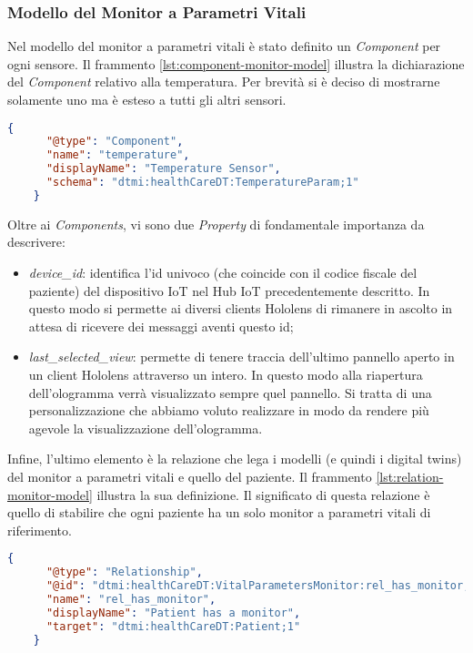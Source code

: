 \subsubsection{Modello del Monitor a Parametri Vitali}

Nel modello del monitor a parametri vitali è stato definito un \textit{Component} per ogni sensore. Il frammento \ref{lst:component-monitor-model} illustra la dichiarazione del \textit{Component} relativo alla temperatura. Per brevità si è deciso di mostrarne solamente uno ma è esteso a tutti gli altri sensori.
\begin{lstlisting}[label={lst:component-monitor-model}, caption={Componente temperature del modello del monitor.}, language=json, firstnumber=1]
    {
      "@type": "Component",
      "name": "temperature",
      "displayName": "Temperature Sensor",
      "schema": "dtmi:healthCareDT:TemperatureParam;1"
    }
\end{lstlisting}

Oltre ai \textit{Components}, vi sono due \textit{Property} di fondamentale importanza da descrivere:

\begin{itemize}
    \item \textit{device\_id}: identifica l'id univoco (che coincide con il codice fiscale del paziente) del dispositivo IoT nel Hub IoT precedentemente descritto. In questo modo si permette ai diversi clients Hololens di rimanere in ascolto in attesa di ricevere dei messaggi aventi questo id;
    
    \item \textit{last\_selected\_view}: permette di tenere traccia dell'ultimo pannello aperto in un client Hololens attraverso un intero. In questo modo alla riapertura dell'ologramma verrà visualizzato sempre quel pannello. Si tratta di una personalizzazione che abbiamo voluto realizzare in modo da rendere più agevole la visualizzazione dell'ologramma.
\end{itemize}

Infine, l'ultimo elemento è la relazione che lega i modelli (e quindi i digital twins) del monitor a parametri vitali e quello del paziente.
Il frammento \ref{lst:relation-monitor-model} illustra la sua definizione. Il significato di questa relazione è quello di stabilire che ogni paziente ha un solo monitor a parametri vitali di riferimento.

\begin{lstlisting}[label={lst:relation-monitor-model}, caption={Relazione del modello del monitor e quello del paziente.}, language=json, firstnumber=1]
    {
      "@type": "Relationship",
      "@id": "dtmi:healthCareDT:VitalParametersMonitor:rel_has_monitor;1",
      "name": "rel_has_monitor",
      "displayName": "Patient has a monitor",
      "target": "dtmi:healthCareDT:Patient;1"
    }
\end{lstlisting}

